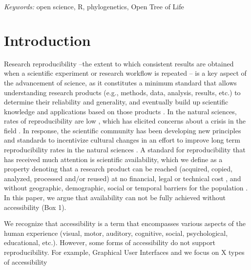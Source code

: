 \documentclass[12pt]{article}
\begin{document}
\noindent%
{\it Keywords:}  open science, R, phylogenetics, Open Tree of Life
\vfill

\newpage
{} %
\section*{Introduction}
\label{sec:intro}

Research reproducibility --the extent to which consistent results are obtained when
a scientific experiment or research workflow is repeated \citep{repdef2021}--
is a key aspect of the advancement
of science, as it constitutes a minimum standard that allows understanding research products
(e.g., methods, data, analysis, results, etc.)
to determine their reliability and generality, and eventually build up scientific
knowledge and applications based on those products
\citep{king1995replication, peng2011reproducible, powers2019open}.
In the natural sciences, rates of reproducibility are low \citep{ioannidis2005most, prinz2011believe},
which has elicited concerns about a crisis in the field \citep{baker2016reproducibility}.
In response, the scientific community has been developing new principles and standards to incentivize
cultural changes in an effort to improve long term reproducibility rates in the natural sciences
\citep{peng2015reproducibility, wilkinson2016fair}.
A standard for reproducibility that has received much attention is scientific availability, which
we define as a property denoting that a research product can be reached (acquired, copied, analyzed,
processed and/or reused) at no financial, legal or technical cost \citep{arnold2019turing},
and without geographic, demographic, social or temporal barriers for the population \citep{fecher2014open}.
In this paper, we argue that availability can not be fully achieved without accessibility (Box 1).

We recognize that accessibility is a term that encompasses various aspects
of the human experience (visual, motor, auditory, cognitive, social, psychological,
educational, etc.).
However, some forms of accessibility do not support reproducibility. For example,
Graphical User Interfaces
and
we focus on X types of accessibility

\end{document}
